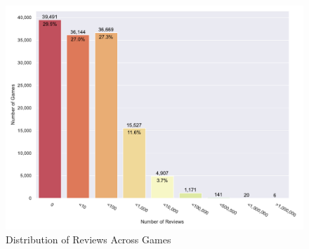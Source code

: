 \begin{figure}[h]
    \centering
    \includegraphics[width=.9\textwidth]{data/results/plots/review_plot}
    \caption{Distribution of Reviews Across Games}
    \label{fig:review_plot}
\end{figure}